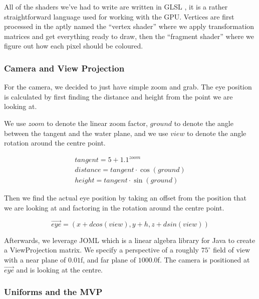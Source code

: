 \documentclass{article}
\begin{document}
\begin{multicols}{2}
                    All of the shaders we've had to write are written in GLSL \cite{GLSL}, it is a rather straightforward language used for working with the GPU. Vertices are first processed in the aptly named the ``vertex shader'' where we apply transformation matrices and get everything ready to draw, then the ``fragment shader'' where we figure out how each pixel should be coloured. 

                \subsubsection{Camera and View Projection}

                    For the camera, we decided to just have simple zoom and grab. The eye position is calculated by first finding the distance and height from the point we are looking at.

                    We use $zoom$ to denote the linear zoom factor, $ground$ to denote the angle between the tangent and the water plane, and we use $view$ to denote the angle rotation around the centre point.

                    \[
                        \begin{array}{l}
                            tangent = 5 + 1.1^{zoom} \\
                            distance = tangent \cdot \cos(ground) \\
                            height = tangent \cdot \sin(ground)
                        \end{array}
                    \]

                    Then we find the actual eye position by taking an offset from the position that we are looking at and factoring in the rotation around the centre point.

                    \[
                        \vec{eye} = (x + d cos(view), y + h, z + d sin(view))
                    \]

                    Afterwards, we leverage JOML \cite{JOML} which is a linear algebra library for Java to create a ViewProjection matrix. We specify a perspective of a roughly $ 75^\circ $ field of view with a near plane of $ 0.01 $f, and far plane of $ 1000.0 $f. The camera is positioned at $ \vec{eye} $ and is looking at the centre.

                \subsubsection{Uniforms and the MVP}


\end{multicols}
\end{document}
